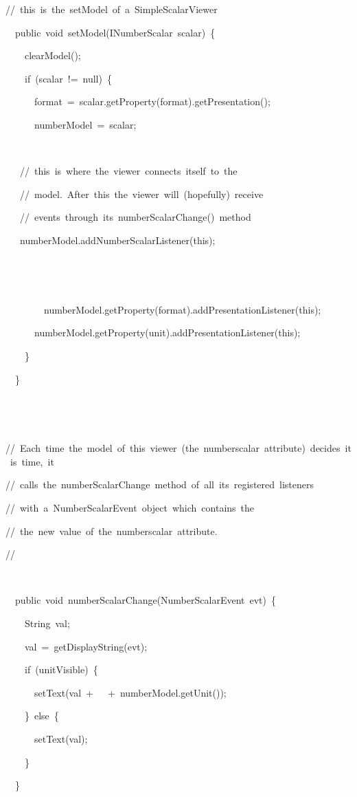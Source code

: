 
\begin{lyxcode}
//~this~is~the~setModel~of~a~SimpleScalarViewer

~~public~void~setModel(INumberScalar~scalar)~\{



~~~~clearModel();



~~~~if~(scalar~!=~null)~\{

~~~~~~format~=~scalar.getProperty(\textquotedbl{}format\textquotedbl{}).getPresentation();

~~~~~~numberModel~=~scalar;

~

~~~//~this~is~where~the~viewer~connects~itself~to~the~

~~~//~model.~After~this~the~viewer~will~(hopefully)~receive~

~~~//~events~through~its~numberScalarChange()~method



~~~numberModel.addNumberScalarListener(this);

~

~~~~~~

~~~~~~~~numberModel.getProperty(\textquotedbl{}format\textquotedbl{}).addPresentationListener(this);

~~~~~~numberModel.getProperty(\textquotedbl{}unit\textquotedbl{}).addPresentationListener(this);

~~~~\}



~~\}

~

~



//~Each~time~the~model~of~this~viewer~(the~numberscalar~attribute)~decides~it~is~time,~it~

//~calls~the~numberScalarChange~method~of~all~its~registered~listeners

//~with~a~NumberScalarEvent~object~which~contains~the~

//~the~new~value~of~the~numberscalar~attribute.

//

~

~~public~void~numberScalarChange(NumberScalarEvent~evt)~\{

~~~~String~val;

~~~~val~=~getDisplayString(evt);

~~~~if~(unitVisible)~\{

~~~~~~setText(val~+~\textquotedbl{}~\textquotedbl{}~+~numberModel.getUnit());

~~~~\}~else~\{

~~~~~~setText(val);

~~~~\}

~~\}






\end{lyxcode}


